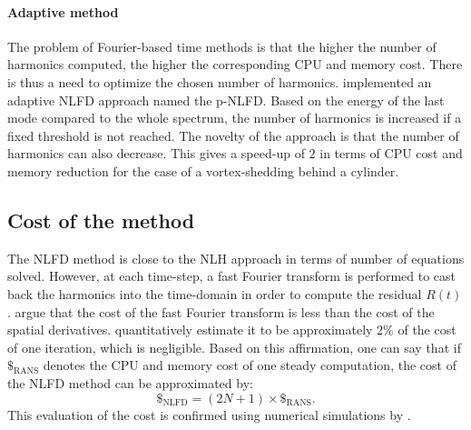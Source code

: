 \paragraph{Adaptive method}
The problem of Fourier-based time methods is that the higher
the number of harmonics computed, the higher the corresponding
CPU and memory cost. There is thus a need to optimize
the chosen number of harmonics.
\citet{Mosahebi2013} implemented an adaptive NLFD approach named
the p-NLFD. Based on the energy of the last mode compared
to the whole spectrum, the number of harmonics
is increased if a fixed threshold is not reached.
The novelty of the approach is that the number of
harmonics can also decrease.
This gives a speed-up of $2$ in terms of CPU cost and
memory reduction for the case of a
vortex-shedding behind a cylinder.

\subsection{Cost of the method}
The NLFD method is close to the NLH approach in terms of number
of equations solved. However, at each time-step, a fast Fourier transform
is performed to cast back the harmonics into the time-domain in order
to compute the residual $R(t)$. \citet{McMullen2006} argue
that the cost of the fast Fourier transform is less than the cost of 
the spatial derivatives. 
\citet{Kachra2008} quantitatively estimate it to be
approximately $2\%$ of the cost of one iteration, which is negligible.
Based on this affirmation, one can say that 
if $\mathdollar_{\text{RANS}}$ 
denotes the CPU and memory cost of
one steady computation, the cost of the NLFD method can be 
approximated by:
\begin{equation}
	\mathdollar_{\text{NLFD}} = (2N+1) \times \mathdollar_{\text{RANS}}.
\end{equation}
This evaluation of the cost is confirmed using numerical
simulations by \citet{McMullen2002}.